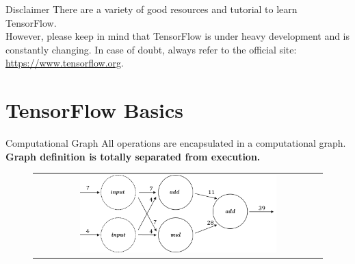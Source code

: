 \documentclass[aspectratio=169]{beamer}
\begin{document}

\begin{frame}{Disclaimer}
There are a variety of good resources and tutorial to learn TensorFlow.\\
\vspace{0.5cm}
However, please keep in mind that TensorFlow is under heavy development and is constantly changing. In case of doubt, always refer to the official site: \url{https://www.tensorflow.org}.
\end{frame}


\section{TensorFlow Basics}

\begin{frame}{Computational Graph}
All operations are encapsulated in a computational graph.\\
\vspace{0.5cm}
\textbf{Graph definition is totally separated from execution.}\vspace{0.5cm}
\begin{figure}
\begin{tabular}{c}
	\includegraphics[width=0.7\textwidth]{img/tf/computational_graph.png}
\end{tabular}
\end{figure}
\end{frame}

\end{document}
